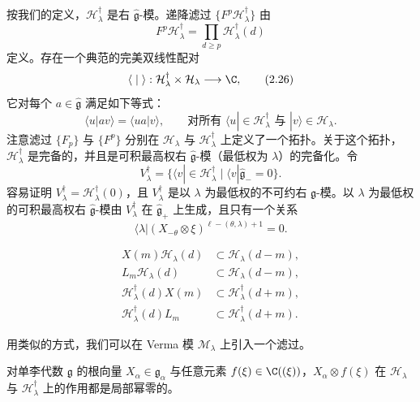 
按我们的定义，$\mathcal{H}^{\dagger}_{\lambda}$ 是右 $\hat{\mathfrak{g}}$-模。递降滤过
$\{F^{p}\mathcal{H}^{\dagger}_{\lambda}\}$ 由
\begin{equation}
F^{p}\mathcal{H}^{\dagger}_{\lambda}=\prod_{d\ge p}\mathcal{H}^{\dagger}_{\lambda}(d) \tag{2.25}
\end{equation}
定义。存在一个典范的完美双线性配对
\begin{equation}
\langle\;|\;\rangle:\mathcal{H}^{\dagger}_{\lambda}\times\mathcal{H}_{\lambda}
\longrightarrow\C, \tag{2.26}
\end{equation}
它对每个 $a\in\hat{\mathfrak{g}}$ 满足如下等式：
\[
\langle u|av\rangle=\langle ua|v\rangle,\qquad
\text{对所有 }\langle u|\in\mathcal{H}^{\dagger}_{\lambda}\text{ 与 }|v\rangle\in\mathcal{H}_{\lambda}.
\]
注意滤过 $\{F_p\}$ 与 $\{F^{p}\}$ 分别在 $\mathcal{H}_{\lambda}$ 与
$\mathcal{H}^{\dagger}_{\lambda}$ 上定义了一个拓扑。关于这个拓扑，
$\mathcal{H}^{\dagger}_{\lambda}$ 是完备的，并且是可积最高权右 $\hat{\mathfrak{g}}$-模（最低权为
$\lambda$）的完备化。令
\[
V^{\dagger}_{\lambda}=\{\langle v|\in\mathcal{H}^{\dagger}_{\lambda}\mid
\langle v|\hat{\mathfrak{g}}_-=0\}.
\]
容易证明 $V^{\dagger}_{\lambda}=\mathcal{H}^{\dagger}_{\lambda}(0)$，且 $V^{\dagger}_{\lambda}$
是以 $\lambda$ 为最低权的不可约右 $\mathfrak{g}$-模。以 $\lambda$ 为最低权的可积最高权右
$\hat{\mathfrak{g}}$-模由 $V^{\dagger}_{\lambda}$ 在 $\hat{\mathfrak{g}}_+$ 上生成，且只有一个关系
\[
\langle\lambda|(X_{-\theta}\otimes\xi)^{\ell-(\theta,\lambda)+1}=0.
\]

\begin{lemma}[2.15]
\[
\begin{aligned}
X(m)\mathcal{H}_{\lambda}(d)&\subset\mathcal{H}_{\lambda}(d-m),\\
L_{m}\mathcal{H}_{\lambda}(d)&\subset\mathcal{H}_{\lambda}(d-m),\\
\mathcal{H}^{\dagger}_{\lambda}(d)X(m)&\subset\mathcal{H}^{\dagger}_{\lambda}(d+m),\\
\mathcal{H}^{\dagger}_{\lambda}(d)L_{m}&\subset\mathcal{H}^{\dagger}_{\lambda}(d+m).
\end{aligned}
\]
\end{lemma}

用类似的方式，我们可以在 Verma 模 $\mathcal{M}_{\lambda}$ 上引入一个滤过。

\begin{proposition}[2.16]
对单李代数 $\mathfrak{g}$ 的根向量 $X_{\alpha}\in\mathfrak{g}_{\alpha}$ 与任意元素
$f(\xi)\in\C((\xi))$，$X_{\alpha}\otimes f(\xi)$ 在 $\mathcal{H}_{\lambda}$ 与
$\mathcal{H}^{\dagger}_{\lambda}$ 上的作用都是局部幂零的。
\end{proposition}

